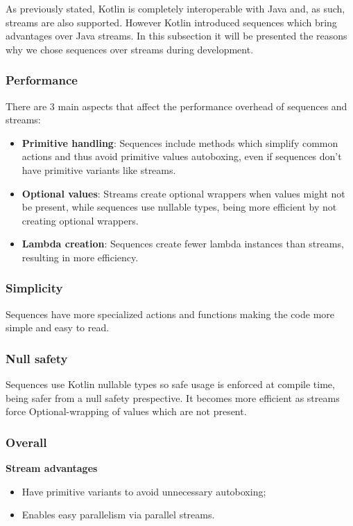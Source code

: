 As previously stated, Kotlin is completely interoperable with Java and, as such, streams are also supported. However Kotlin introduced sequences which bring
advantages over Java streams. In this subsection it will be presented the reasons why we chose sequences over streams during development.

\subsubsection{Performance}

There are 3 main aspects that affect the performance overhead of sequences and streams:
 \begin{itemize}
     \item \textbf{Primitive handling}: Sequences include methods which simplify common actions and thus avoid primitive values autoboxing, even if sequences don't have primitive variants like streams.
     \item \textbf{Optional values}: Streams create optional wrappers when values might not be present, while sequences use nullable types, being more efficient by not creating optional wrappers.
     \item \textbf{Lambda creation}: Sequences create fewer lambda instances than streams, resulting in more efficiency.
 \end{itemize}

 \subsubsection{Simplicity}

 Sequences have more specialized actions and functions making the code more simple and easy to read.

 \subsubsection{Null safety}

 Sequences use Kotlin nullable types so safe usage is enforced at compile time, being safer from a null safety prespective. It becomes more efficient as streams force Optional-wrapping of values which are not present.

 \subsubsection{Overall}

 \textbf{Stream advantages}
 \begin{itemize}
     \item Have primitive variants to avoid unnecessary autoboxing;
     \item Enables easy parallelism via parallel streams.
 \end{itemize}

